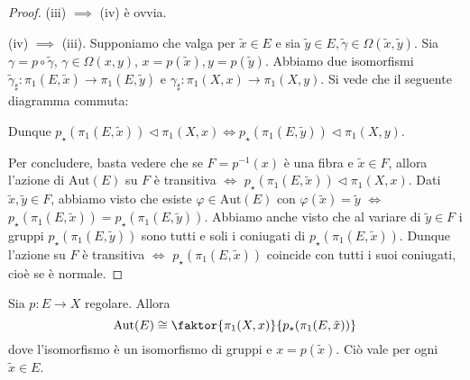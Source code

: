 \begin{proof}
  (iii) $\implies$ (iv) è ovvia.

  (iv) $\implies$ (iii). Supponiamo che valga per $\tilde{x} \in E$ e sia $\tilde{y} \in E, \tilde{\gamma} \in \Omega(\tilde{x}, \tilde{y})$. Sia $\gamma=p \circ \tilde{\gamma}$, $\gamma \in \Omega(x, y)$, $x=p(\tilde{x}), y=p(\tilde{y})$.
  Abbiamo due isomorfismi $\tilde{\gamma}_{\sharp}: \pi_1(E, \tilde{x}) \longrightarrow \pi_1(E, \tilde{y})$ e $\gamma_{\sharp}:\pi_1(X, x) \longrightarrow \pi_1(X, y)$. Si vede che il seguente diagramma commuta:
  \begin{center}
  \end{center}
  Dunque $p_{\star}(\pi_1(E, \tilde{x})) \vartriangleleft \pi_1(X, x) \iff p_{\star}(\pi_1(E, \tilde{y})) \vartriangleleft \pi_1(X, y)$.

  Per concludere, basta vedere che se $F=p^{-1}(x)$ è una fibra e $\tilde{x} \in F$, allora l'azione di $\text{Aut}(E)$ su $F$ è transitiva $\iff$ $p_{\star}(\pi_1(E, \tilde{x})) \vartriangleleft \pi_1(X, x)$.
  Dati $\tilde{x}, \tilde{y} \in F$, abbiamo visto che esiste $\varphi \in \text{Aut}(E)$ con $\varphi(\tilde{x})=\tilde{y}$ $\iff$ $p_{\star}(\pi_1(E, \tilde{x}))=p_{\star}(\pi_1(E, \tilde{y}))$.
  Abbiamo anche visto che al variare di $\tilde{y} \in F$ i gruppi $p_{\star}(\pi_1(E, \tilde{y}))$ sono tutti e soli i coniugati di $p_{\star}(\pi_1(E, \tilde{x}))$. Dunque l'azione su $F$ è transitiva $\iff$ $p_{\star}(\pi_1(E, \tilde{x}))$ coincide con tutti i suoi coniugati, cioè se è normale.
\end{proof}

\begin{thm}
  Sia $p:E \longrightarrow X$ regolare. Allora
  $$\text{Aut}(E) \cong \faktor{\pi_1(X, x)}{p_{\star}(\pi_1(E, \tilde{x}))}$$
  dove l'isomorfismo è un isomorfismo di gruppi e $x=p(\tilde{x})$. Ciò vale per ogni $\tilde{x} \in E$.
\end{thm}

